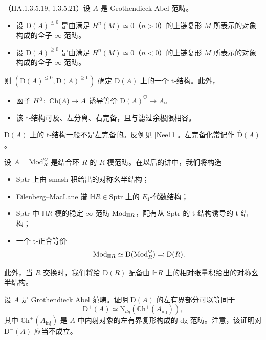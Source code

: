 \begin{proposition}\label{L17-3.1}
（HA.1.3.5.19, 1.3.5.21）设 $A$ 是 Grothendieck Abel 范畴。
\begin{itemize}[leftmargin=2.2em,itemsep=0.1em]
\item 设 $\mathrm{D}(A)^{\le0}$ 是由满足 $H^n(M)\simeq0$（$n>0$）的上链复形 $M$ 所表示的对象构成的全子 $\infty$-范畴。
\item 设 $\mathrm{D}(A)^{\ge0}$ 是由满足 $H^n(M)\simeq0$（$n<0$）的上链复形 $M$ 所表示的对象构成的全子 $\infty$-范畴。
\end{itemize}
则 $(\mathrm{D}(A)^{\le0},\mathrm{D}(A)^{\ge0})$ 确定 $\mathrm{D}(A)$ 上的一个 t-结构。此外，
\begin{itemize}[leftmargin=2.2em,itemsep=0.1em]
\item 函子 $H^0\colon\operatorname{Ch}(A)\to A$ 诱导等价 $\mathrm{D}(A)^{\heartsuit}\to A$。
\item 该 t-结构可及、左分离、右完备，且与滤过余极限相容。
\end{itemize}
\end{proposition}

\begin{warning}\label{L17-3.2}
$\mathrm{D}(A)$ 上的 t-结构一般不是左完备的。反例见 [Nee11]。左完备化常记作 $\widehat{\mathrm{D}}(A)$。
\end{warning}

\begin{example}\label{L17-3.3}
设 $A=\operatorname{Mod}_R^{\heartsuit}$ 是结合环 $R$ 的 $R$-模范畴。在以后的讲中，我们将构造
\begin{itemize}[leftmargin=2.2em,itemsep=0.1em]
\item $\mathrm{Sptr}$ 上由 smash 积给出的对称幺半结构；
\item Eilenberg–MacLane 谱 $\mathbb{H}R\in\mathrm{Sptr}$ 上的 $E_1$-代数结构；
\item $\mathrm{Sptr}$ 中 $\mathbb{H}R$-模的稳定 $\infty$-范畴 $\operatorname{Mod}_{\mathbb{H}R}$，配有从 $\mathrm{Sptr}$ 的 t-结构诱导的 t-结构；
\item 一个 t-正合等价
\[
\operatorname{Mod}_{\mathbb{H}R}\simeq\mathrm{D}(\operatorname{Mod}_R^{\heartsuit})\eqqcolon\mathrm{D}(R).
\]
\end{itemize}
此外，当 $R$ 交换时，我们将给 $\mathrm{D}(R)$ 配备由 $\mathbb{H}R$ 上的相对张量积给出的对称幺半结构。
\end{example}

\begin{exercise}\label{L17-3.4}
设 $A$ 是 Grothendieck Abel 范畴。证明 $\mathrm{D}(A)$ 的左有界部分可以等同于
\[
\mathrm{D}^+(A)\simeq\mathrm{N}_{dg}(\mathbb{C}\mathrm{h}^+(A_{\mathrm{inj}})),
\]
其中 $\mathbb{C}\mathrm{h}^+(A_{\mathrm{inj}})$ 是 $A$ 中内射对象的左有界复形构成的 dg-范畴。注意，该证明对 $\mathrm{D}^-(A)$ 应当不成立。
\end{exercise}

